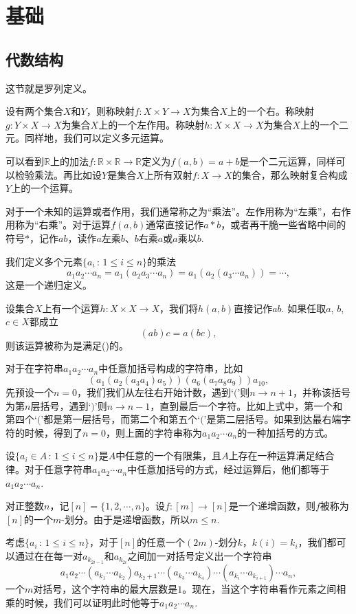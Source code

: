 \chapter{基础}

\section{代数结构}

这节就是罗列定义。

\para 设有两个集合$X$和$Y$，则称映射$f:X\times Y \to X$为集合$X$上的一个右。称映射$g:Y\times X \to X$为集合$X$上的一个左作用。称映射$h:X\times X \to X$为集合$X$上的一个二元。同样地，我们可以定义多元运算。

可以看到$\mathbb{R}$上的加法$f:\mathbb{R}\times \mathbb{R} \to \mathbb{R}$定义为$f(a,b)=a+b$是一个二元运算，同样可以检验乘法。再比如设$Y$是集合$X$上所有双射$f:X\to X$的集合，那么映射复合构成$Y$上的一个运算。

对于一个未知的运算或者作用，我们通常称之为“乘法”。左作用称为“左乘”，右作用称为“右乘”。对于运算$f(a,b)$通常直接记作$a*b$，或者再干脆一些省略中间的符号$*$，记作$ab$，读作$a$左乘$b$、$b$右乘$a$或$a$乘以$b$.

我们定义多个元素$\{a_i\,:\, 1\leq i \leq n\}$的乘法
\[
	a_1a_2\cdots a_n=a_1(a_2a_3\cdots a_n)=a_1(a_2(a_3\cdots a_n))=\cdots,
\]
这是一个递归定义。

\para 设集合$X$上有一个运算$h:X\times X \to X$，我们将$h(a,b)$直接记作$ab$. 如果任取$a$, $b$, $c\in X$都成立
\[
	(ab)c=a(bc),
\]
则该运算被称为是满足()的。

\para 对于在字符串$a_1a_2\cdots a_n$中任意加括号构成的字符串，比如
\[
(a_1(a_2(a_3a_4)a_5))(a_6(a_7a_8a_9))a_{10},
\]
先预设一个$n=0$，我们我们从左往右开始计数，遇到`$($'则$n\to n+1$，并称该括号为第$n$层括号，遇到`$)$'则$n\to n-1$，直到最后一个字符。比如上式中，第一个和第四个`$($'都是第一层括号，而第二个和第五个`$($'是第二层括号。如果到达最右端字符的时候，得到了$n=0$，则上面的字符串称为$a_1a_2\cdots a_n$的一种加括号的方式。

\pro 设$\{a_i\in A\,:\, 1\leq i\leq n\}$是$A$中任意的一个有限集，且$A$上存在一种运算满足结合律。对于任意字符串$a_1a_2\cdots a_n$中任意加括号的方式，经过运算后，他们都等于$a_1a_2\cdots a_n$.

\proof 对正整数$n$，记$[n]=\{1,2,\cdots,n\}$。设$f:[m]\to [n]$是一个递增函数，则$f$被称为$[n]$的一个$m$-划分。由于是递增函数，所以$m\leq n$. 

考虑$\{a_i\, :\, 1\leq i\leq n\}$，对于$[n]$的任意一个$(2m)$-划分$k$，$k(i)=k_i$，我们都可以通过在在每一对$a_{k_{2i-1}}$和$a_{k_{2i}}$之间加一对括号定义出一个字符串
\[
	a_1a_2\cdots (a_{k_1}\cdots a_{k_2})a_{k_2+1}\cdots (a_{k_3}\cdots a_{k_4})\cdots (a_{k_i}\cdots a_{k_{i+1}})\cdots a_n,
\]
一个$m$对括号，这个字符串的最大层数是$1$。现在，当这个字符串看作元素之间相乘的时候，我们可以证明此时他等于$a_1a_2\cdots a_n$.

